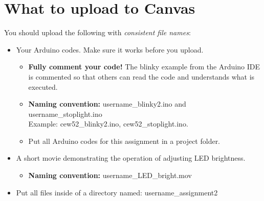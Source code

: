 \documentclass[10pt]{article}
\begin{document}
\section*{What to upload to Canvas}
You should upload the following with \textit{consistent file names}:

\begin{itemize}
	\item Your Arduino codes. Make sure it works before you upload.
	\begin{itemize}
		\item \textbf{Fully comment your code!} The blinky example from the Arduino IDE is commented so that others can read the code and understands what is executed. 
		\item \textbf{Naming convention:} username\_blinky2.ino and username\_stoplight.ino\\
		Example: cew52\_blinky2.ino, cew52\_stoplight.ino.
		\item Put all Arduino codes for this assignment in a project folder. 
	\end{itemize}

	\item A short movie demonstrating the operation of adjusting LED brightness.
	\begin{itemize}
		\item \textbf{Naming convention:} username\_LED\_bright.mov
	\end{itemize}

	\item Put all files inside of a directory named: username\_assignment2
\end{itemize}

\end{document}
